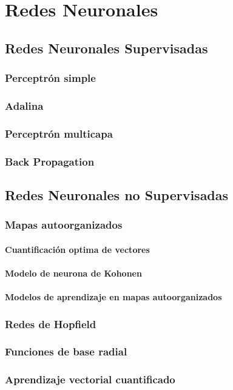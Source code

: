 \chapter{Redes Neuronales}
\label{cha:redes}


\section{Redes Neuronales Supervisadas}



\subsection{Perceptrón simple}



\subsection{Adalina}


\subsection{Perceptrón multicapa}


\subsection{Back Propagation}


\section{Redes Neuronales no Supervisadas}


\subsection{Mapas autoorganizados}


\subsubsection{Cuantificación optima de vectores}



\subsubsection{Modelo de neurona de Kohonen}


\subsubsection{Modelos de aprendizaje en mapas autoorganizados}



\subsection{Redes de Hopfield}



\subsection{Funciones de base radial}



\subsection{Aprendizaje vectorial cuantificado}
